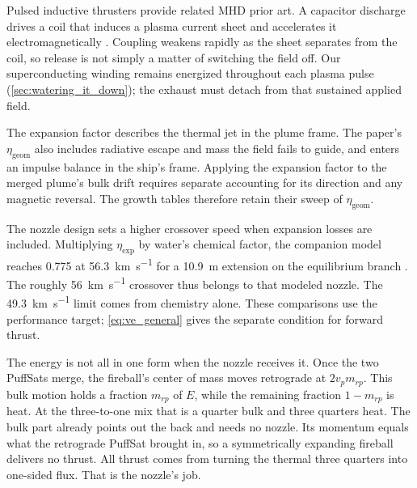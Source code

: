 \documentclass{article}
\begin{document}
Pulsed inductive thrusters provide related MHD prior art. A capacitor discharge drives a coil that induces a plasma current sheet and accelerates it electromagnetically \cite{polzin2007pulsed_inductive}. Coupling weakens rapidly as the sheet separates from the coil, so release is not simply a matter of switching the field off. Our superconducting winding remains energized throughout each plasma pulse (\autoref{sec:watering_it_down}); the exhaust must detach from that sustained applied field.

The expansion factor describes the thermal jet in the plume frame. The paper's $\eta_{\mathrm{geom}}$ also includes radiative escape and mass the field fails to guide, and enters an impulse balance in the ship's frame. Applying the expansion factor to the merged plume's bulk drift requires separate accounting for its direction and any magnetic reversal. The growth tables therefore retain their sweep of $\eta_{\mathrm{geom}}$.

The nozzle design sets a higher crossover speed when expansion losses are included. Multiplying $\eta_{\mathrm{exp}}$ by water's chemical factor, the companion model reaches 0.775 at \SI{56.3}{\kilo\meter\per\second} for a \SI{10.9}{\meter} extension on the equilibrium branch \cite{Katz_puffsat_impact_sim_2026}. The roughly \SI{56}{\kilo\meter\per\second} crossover thus belongs to that modeled nozzle. The \SI{49.3}{\kilo\meter\per\second} limit comes from chemistry alone. These comparisons use the performance target; \autoref{eq:ve_general} gives the separate condition for forward thrust.

The energy is not all in one form when the nozzle receives it. Once the two PuffSats merge, the fireball's center of mass moves retrograde at $2v_pm_{rp}$. This bulk motion holds a fraction $m_{rp}$ of $E$, while the remaining fraction $1-m_{rp}$ is heat. At the three-to-one mix that is a quarter bulk and three quarters heat. The bulk part already points out the back and needs no nozzle. Its momentum equals what the retrograde PuffSat brought in, so a symmetrically expanding fireball delivers no thrust. All thrust comes from turning the thermal three quarters into one-sided flux. That is the nozzle's job.
\end{document}
